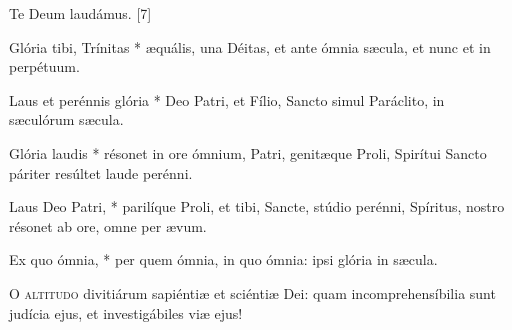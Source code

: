 Te Deum laudámus. [7]


 Glória tibi, Trínitas * æquális, una Déitas, et ante ómnia sæcula, et nunc et in perpétuum.


 Laus et perénnis glória * Deo Patri, et Fílio, Sancto simul Paráclito, in sæculórum sæcula.

 Glória laudis * résonet in ore ómnium, Patri, genitæque Proli, Spirítui Sancto páriter resúltet laude perénni.

 Laus Deo Patri, * parilíque Proli, et tibi, Sancte, stúdio perénni, Spíritus, nostro résonet ab ore, omne per ævum.

 Ex quo ómnia, * per quem ómnia, in quo ómnia: ipsi glória in sæcula.


\lettrine[lines=2]{O}{} \textsc{altitudo} divitiárum sapiéntiæ et sciéntiæ Dei: quam incomprehensíbilia sunt judícia ejus, et investigábiles viæ ejus!


